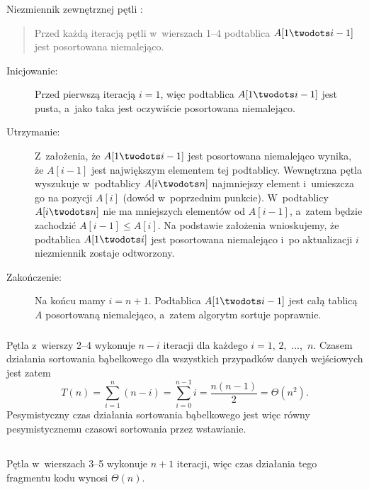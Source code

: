 \subsubsection{} %
Niezmiennik zewnętrznej pętli :
\begin{quote}
Przed każdą iteracją pętli  w~wierszach 1--4 podtablica $A[1\twodots i-1]$ jest posortowana niemalejąco.
\end{quote}
\begin{description}
	\item[Inicjowanie:] Przed pierwszą iteracją $i=1$, więc podtablica $A[1\twodots i-1]$ jest pusta, a~jako taka jest oczywiście posortowana niemalejąco.
	\item[Utrzymanie:] Z~założenia, że $A[1\twodots i-1]$ jest posortowana niemalejąco wynika, że $A[i-1]$ jest największym elementem tej podtablicy. Wewnętrzna pętla  wyszukuje w~podtablicy $A[i\twodots n]$ najmniejszy element i~umieszcza go na pozycji $A[i]$ (dowód w~poprzednim punkcie). W~podtablicy $A[i\twodots n]$ nie ma mniejszych elementów od $A[i-1]$, a~zatem będzie zachodzić $A[i-1]\le A[i]$. Na podstawie założenia wnioskujemy, że podtablica $A[1\twodots i]$ jest posortowana niemalejąco i~po aktualizacji $i$ niezmiennik zostaje odtworzony.
	\item[Zakończenie:] Na końcu mamy $i=n+1$. Podtablica $A[1\twodots i-1]$ jest całą tablicą $A$ posortowaną niemalejąco, a~zatem algorytm sortuje poprawnie.
\end{description}

\subsubsection{} %
Pętla  z~wierszy 2--4 wykonuje $n-i$ iteracji dla każdego $i=1$, $2$,~$\dots$,~$n$. Czasem działania sortowania bąbelkowego dla wszystkich przypadków danych wejściowych jest zatem
\[
	T(n) = \sum_{i=1}^n(n-i) = \sum_{i=0}^{n-1}i = \frac{n(n-1)}{2} = \Theta(n^2).
\]
Pesymistyczny czas działania sortowania bąbelkowego jest więc równy pesymistycznemu czasowi sortowania przez wstawianie.

\subsection{} %

\subsubsection{} %
Pętla  w~wierszach 3--5 wykonuje $n+1$ iteracji, więc czas działania tego fragmentu kodu wynosi $\Theta(n)$.

